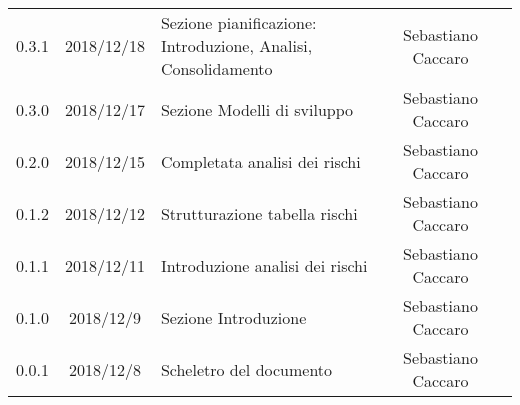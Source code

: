 {\begin{longtable}{ c c  C{4cm}  c  c }
		0.3.1 & 2018/12/18 & Sezione pianificazione: Introduzione, Analisi, Consolidamento & Sebastiano Caccaro & \Res{}\\
		
		0.3.0 & 2018/12/17 & Sezione Modelli di sviluppo & Sebastiano Caccaro & \Res{}\\
				
		0.2.0 & 2018/12/15 & Completata analisi dei rischi & Sebastiano Caccaro & \Res{}\\
				
		0.1.2 & 2018/12/12 & Strutturazione tabella rischi & Sebastiano Caccaro & \Res{}\\
				
		0.1.1 & 2018/12/11 & Introduzione analisi dei rischi & Sebastiano Caccaro & \Res{}\\
				
		0.1.0 & 2018/12/9 & Sezione Introduzione & Sebastiano Caccaro & \Res{}\\
		
		0.0.1 & 2018/12/8 & Scheletro del documento & Sebastiano Caccaro & \Res{}\\
		
	\end{longtable}

}